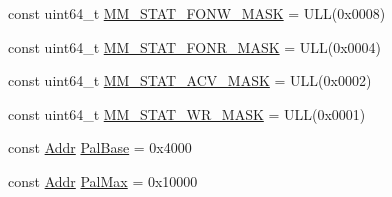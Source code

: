 \begin{DoxyCompactItemize}
\item 
const uint64\_\-t \hyperlink{namespaceAlphaISA_a0bd71744e6a29780f244bc897291ca57}{MM\_\-STAT\_\-FONW\_\-MASK} = ULL(0x0008)
\item 
const uint64\_\-t \hyperlink{namespaceAlphaISA_aab1a75bed1961a122e6bb731b866cf27}{MM\_\-STAT\_\-FONR\_\-MASK} = ULL(0x0004)
\item 
const uint64\_\-t \hyperlink{namespaceAlphaISA_a0affe5a0a033bf0f88646d2f683935be}{MM\_\-STAT\_\-ACV\_\-MASK} = ULL(0x0002)
\item 
const uint64\_\-t \hyperlink{namespaceAlphaISA_a305c800386d962542fb4c74e5961121f}{MM\_\-STAT\_\-WR\_\-MASK} = ULL(0x0001)
\item 
const \hyperlink{base_2types_8hh_af1bb03d6a4ee096394a6749f0a169232}{Addr} \hyperlink{namespaceAlphaISA_a472839c7f0afafca3f4e2d5dd2179ab2}{PalBase} = 0x4000
\item 
const \hyperlink{base_2types_8hh_af1bb03d6a4ee096394a6749f0a169232}{Addr} \hyperlink{namespaceAlphaISA_abc996cfd68e764265e505f2904723667}{PalMax} = 0x10000
\end{DoxyCompactItemize}
